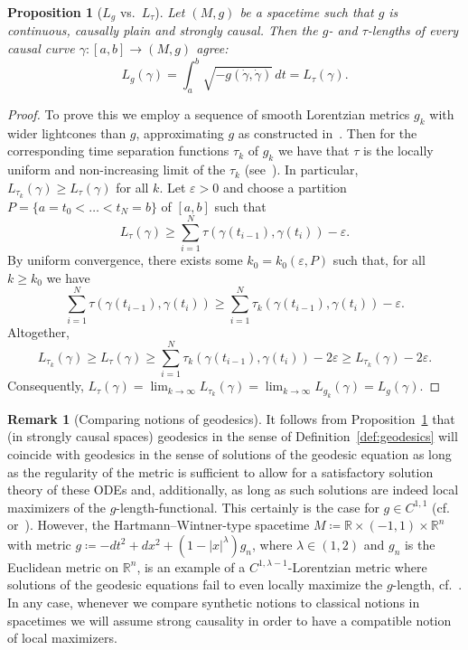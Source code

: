 \documentclass[a4paper,11pt]{article}
\numberwithin{equation}{section}
\theoremstyle{plain}
\newtheorem{Proposition}[Definition]{Proposition}
\theoremstyle{definition}
\newtheorem{Remark}[Definition]{Remark}
\newcommand{\R}{\mathbb R}
\newcommand{\eps}{\varepsilon}
\begin{document}
\begin{Proposition}[$L_g$ vs.\ $L_\tau$]
\label{Proposition: Lg vs Ltau}
Let $(M,g)$ be a spacetime such that $g$ is continuous, causally plain and strongly causal. Then the $g$- and $\tau$-lengths of every causal curve $\gamma \colon [a, b] \to (M,g)$ agree:
\[
L_g(\gamma) = \int_a^b \sqrt{-g(\dot\gamma,\dot\gamma)} \,dt = L_\tau(\gamma).
\]
\end{Proposition}
\begin{proof}
To prove this we employ a sequence of smooth Lorentzian metrics $g_k$ with wider lightcones than $g$, approximating $g$ as constructed in~\cite[Lem.\ A.1]{McCann_Saemann22}. Then for the corresponding time separation functions $\tau_k$ of $g_k$ we have that $\tau$ is the locally uniform and non-increasing limit of the $\tau_k$ (see~\cite[Lem.\ A.2]{McCann_Saemann22}). In particular, $L_{\tau_k}(\gamma) \ge L_\tau(\gamma)$ for all $k$. Let $\eps>0$ and choose a partition $P=\{a=t_0<\dots<t_{N}=b\}$ of $[a,b]$ such that
\[
L_\tau(\gamma) \ge \sum_{i=1}^N \tau(\gamma(t_{i-1}),\gamma(t_i)) - \eps.
\]
By uniform convergence, there exists some $k_0=k_0(\eps,P)$ such that, for all $k\ge k_0$ we have
\[
\sum_{i=1}^N \tau(\gamma(t_{i-1}),\gamma(t_i)) \ge \sum_{i=1}^N \tau_k(\gamma(t_{i-1}),\gamma(t_i)) -\eps.
\]
Altogether,
\[
L_{\tau_k}(\gamma) \ge L_\tau(\gamma) \ge \sum_{i=1}^N \tau_k(\gamma(t_{i-1}),\gamma(t_i)) - 2\eps 
\ge L_{\tau_k}(\gamma) -2\eps.
\]
Consequently, $L_\tau(\gamma) = \lim_{k\to\infty} L_{\tau_k}(\gamma) = \lim_{k\to \infty} L_{g_k}(\gamma) =L_g(\gamma)$.
\end{proof}

\begin{Remark}[Comparing notions of geodesics]
It follows from Proposition~\ref{Proposition: Lg vs Ltau} that (in strongly causal spaces) geodesics in the sense of Definition~\ref{def:geodesics} will coincide with geodesics
in the sense of solutions of the geodesic equation as long as the regularity of the metric is sufficient to allow for a satisfactory
solution theory of these ODEs and, additionally, as long as such solutions are indeed local maximizers of the $g$-length-functional.
This certainly is the case for $g\in C^{1,1}$ (cf.\ \cite{minguzzi2015convex} or~\cite{kunzinger2014regularisation}). However, 
the Hartmann--Wintner-type spacetime
$M \coloneqq \R \times (-1,1) \times \R^n$ with metric $g \coloneqq -dt^2 + dx^2 + (1 - |x|^{\lambda})g_n$, where $\lambda \in (1, 2)$ and $g_n$ is the Euclidean metric on $\R^n$, is 
an example of a $C^{1,\lambda-1}$-Lorentzian metric where solutions of the geodesic equations fail to even locally maximize the $g$-length, cf.\ \cite[Ex.\ 2.4]{samann2018geodesics}. In any case, whenever we compare synthetic notions to classical notions in spacetimes we will assume strong causality in order to have a compatible notion of local maximizers.
\end{Remark}
\end{document}
